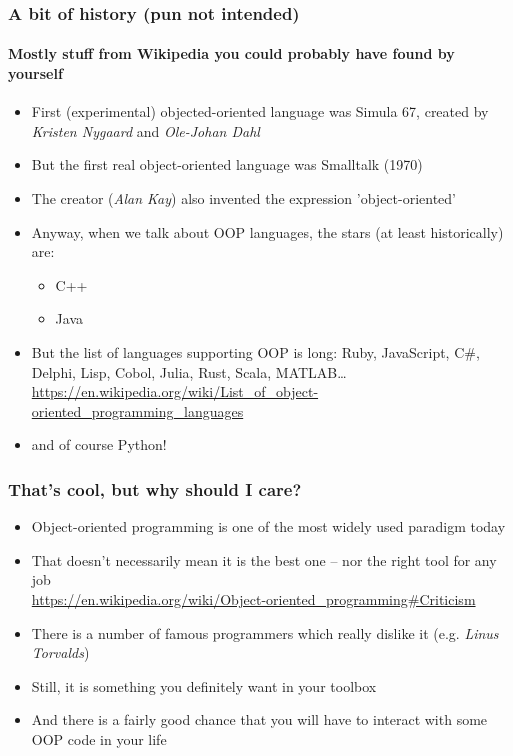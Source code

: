 \documentclass[9pt]{beamer}
\begin{document}
\begin{frame}
  \frametitle{A bit of history (pun not intended)}
  \framesubtitle{Mostly stuff from Wikipedia you could probably have found by yourself}
  \begin{itemize}
    \item First (experimental) objected-oriented language was \alert{Simula 67}, created by \emph{Kristen Nygaard} and \emph{Ole-Johan Dahl}
    \medskip
    \item But the first real object-oriented language was \alert{Smalltalk} (1970)
    \smallskip
    \item The creator (\emph{Alan Kay}) also invented the expression 'object-oriented'
    \medskip
    \item Anyway, when we talk about OOP languages, the stars (at least historically) are:
    \begin{itemize}
      \item C++
      \smallskip
      \item Java
    \end{itemize}
    \smallskip
    \item But the list of languages supporting OOP is long: Ruby, JavaScript, C\#, Delphi, Lisp, Cobol, Julia, Rust, Scala, MATLAB\dots \\
    \tiny
    \url{https://en.wikipedia.org/wiki/List_of_object-oriented_programming_languages}
    \normalsize
    \smallskip
    \item and of course Python!
  \end{itemize}
\end{frame}


\begin{frame}
  \frametitle{That's cool, but why should I care?}
  
  \begin{itemize}
    \item Object-oriented programming is one of the most widely used paradigm today
    \smallskip
    \item That doesn't necessarily mean it is the best one -- nor the right tool for any job \\
    \tiny
    \url{https://en.wikipedia.org/wiki/Object-oriented_programming\#Criticism}
    \normalsize
    \smallskip
        
    \item There is a number of famous programmers which really dislike it (e.g. \emph{Linus Torvalds})
    \medskip
    \item Still, it is something you definitely want in your toolbox
    \medskip
    \item And there is a fairly good chance that you will have to interact with some OOP
          code in your life
    \smallskip   
  \end{itemize}

\end{frame}
\end{document}
